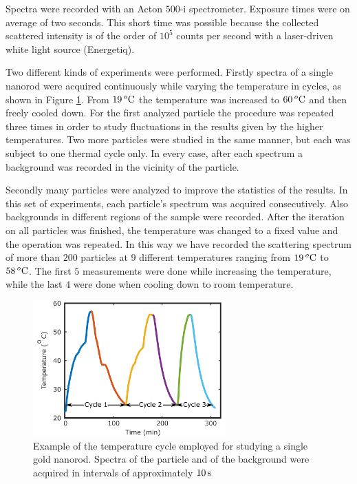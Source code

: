 Spectra were recorded with an Acton $500\textrm{-i}$ spectrometer. Exposure
times were on average of two seconds. This short time was possible because the
collected scattered intensity is of the order of $10^5$ counts per second with a
laser-driven white light source (Energetiq).

Two different kinds of experiments were performed. Firstly spectra of a single
nanorod were acquired continuously while varying the temperature in cycles, as
shown in Figure \ref{fig:temp-cycle}. From $19\,^o\textrm{C}$ the temperature was
increased to $60\,^o\textrm{C}$ and then freely cooled down. For the first analyzed
particle the procedure was repeated three times in order to study fluctuations
in the results given by the higher temperatures. Two more particles were studied
in the same manner, but each was subject to one thermal cycle only. In every
case, after each spectrum a background was recorded in the vicinity of the particle.
 
Secondly many particles were analyzed to improve the statistics of the results.
In this set of experiments, each particle's spectrum was acquired consecutively.
Also backgrounds in different regions of the sample were recorded. After the
iteration on all particles was finished, the temperature was changed to a fixed
value and the operation was repeated. In this way we have recorded the
scattering spectrum of more than $200$ particles at $9$ different temperatures
ranging from $19\,^o\textrm{C}$ to $58\,^o\textrm{C}$. The first $5$ measurements were done
while increasing the temperature, while the last $4$ were done when cooling down
to room temperature.

\begin{figure}[tp] \centering
\includegraphics[width=74.2mm]{Chapters/05_WhiteLight/Figures/Supplementary/01_Temp_Cycle/01_Temp_Cycle.png}
\caption{Example of the temperature cycle employed for studying a single gold
nanorod. Spectra of the particle and of the background were acquired in
intervals of approximately $10\,\textrm{s}$}
	\label{fig:temp-cycle}
\end{figure}

